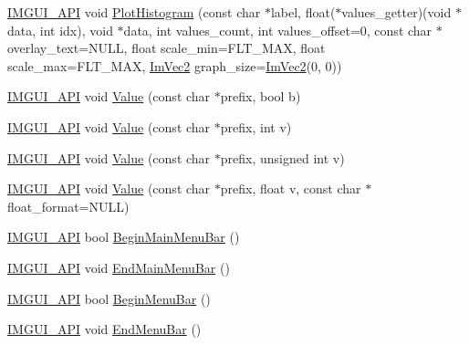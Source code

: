 \begin{DoxyCompactItemize}
\item 
\mbox{\hyperlink{imgui_8h_a43829975e84e45d1149597467a14bbf5}{I\+M\+G\+U\+I\+\_\+\+A\+PI}} void \mbox{\hyperlink{namespace_im_gui_af8089203baf8cf723a158c9e34bda2a4}{Plot\+Histogram}} (const char $\ast$label, float($\ast$values\+\_\+getter)(void $\ast$data, int idx), void $\ast$data, int values\+\_\+count, int values\+\_\+offset=0, const char $\ast$overlay\+\_\+text=N\+U\+LL, float scale\+\_\+min=F\+L\+T\+\_\+\+M\+AX, float scale\+\_\+max=F\+L\+T\+\_\+\+M\+AX, \mbox{\hyperlink{struct_im_vec2}{Im\+Vec2}} graph\+\_\+size=\mbox{\hyperlink{struct_im_vec2}{Im\+Vec2}}(0, 0))
\item 
\mbox{\hyperlink{imgui_8h_a43829975e84e45d1149597467a14bbf5}{I\+M\+G\+U\+I\+\_\+\+A\+PI}} void \mbox{\hyperlink{namespace_im_gui_a1b3324308e43eeded5c3599fa0f03e85}{Value}} (const char $\ast$prefix, bool b)
\item 
\mbox{\hyperlink{imgui_8h_a43829975e84e45d1149597467a14bbf5}{I\+M\+G\+U\+I\+\_\+\+A\+PI}} void \mbox{\hyperlink{namespace_im_gui_a654ceb70f2dd1598f88861f54764ee08}{Value}} (const char $\ast$prefix, int v)
\item 
\mbox{\hyperlink{imgui_8h_a43829975e84e45d1149597467a14bbf5}{I\+M\+G\+U\+I\+\_\+\+A\+PI}} void \mbox{\hyperlink{namespace_im_gui_aec80a3e35bf7c1ff5704334e5a3ebd5a}{Value}} (const char $\ast$prefix, unsigned int v)
\item 
\mbox{\hyperlink{imgui_8h_a43829975e84e45d1149597467a14bbf5}{I\+M\+G\+U\+I\+\_\+\+A\+PI}} void \mbox{\hyperlink{namespace_im_gui_a0c8b87438082a1d0a46ae2a76090ca16}{Value}} (const char $\ast$prefix, float v, const char $\ast$float\+\_\+format=N\+U\+LL)
\item 
\mbox{\hyperlink{imgui_8h_a43829975e84e45d1149597467a14bbf5}{I\+M\+G\+U\+I\+\_\+\+A\+PI}} bool \mbox{\hyperlink{namespace_im_gui_a55cb9cfb9865204ac6fb21c965784f78}{Begin\+Main\+Menu\+Bar}} ()
\item 
\mbox{\hyperlink{imgui_8h_a43829975e84e45d1149597467a14bbf5}{I\+M\+G\+U\+I\+\_\+\+A\+PI}} void \mbox{\hyperlink{namespace_im_gui_ab92f330c808546b340eb7bdf7e5f7c95}{End\+Main\+Menu\+Bar}} ()
\item 
\mbox{\hyperlink{imgui_8h_a43829975e84e45d1149597467a14bbf5}{I\+M\+G\+U\+I\+\_\+\+A\+PI}} bool \mbox{\hyperlink{namespace_im_gui_a4852dff802922163fc747e2e0df5b88f}{Begin\+Menu\+Bar}} ()
\item 
\mbox{\hyperlink{imgui_8h_a43829975e84e45d1149597467a14bbf5}{I\+M\+G\+U\+I\+\_\+\+A\+PI}} void \mbox{\hyperlink{namespace_im_gui_aa226265c140eb6ee375c5b9abc69c4fc}{End\+Menu\+Bar}} ()

\end{DoxyCompactItemize}
